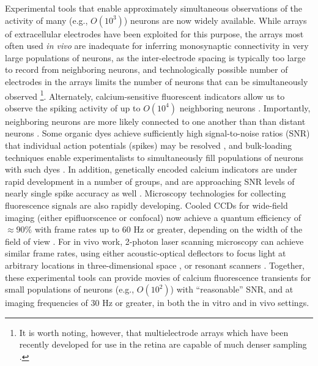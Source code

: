 Experimental tools that enable approximately simultaneous observations of the activity of many (e.g., $O(10^3)$) neurons are now widely available. While arrays of extracellular electrodes have been exploited for this purpose, the arrays most often used \emph{in vivo} are inadequate for inferring monosynaptic connectivity in very large populations of neurons, as the inter-electrode spacing is typically too large to record from neighboring neurons, and technologically possible number of electrodes in the arrays limits the number of neurons that can be simultaneously observed \cite{HATS98,HARR03,Stein04,Santhanam06,Harris07}\footnote{It is worth noting, however, that multielectrode arrays which have been recently developed for use in the retina are capable of much denser sampling \cite{Berry2004,Litke2004,Petrusca07,PILL07}.}. Alternately, calcium-sensitive fluorescent indicators allow us to observe the spiking activity of up to $O(10^4)$ neighboring neurons \cite{Tsien89}.  Importantly, neighboring neurons are more likely connected to one another than than distant neurons \cite{Abeles91,Braitenberg1998}. Some organic dyes achieve sufficiently high signal-to-noise ratios (SNR) that individual action potentials (spikes) may be resolved \cite{ImagingManual}, and bulk-loading techniques enable experimentalists to simultaneously fill populations of neurons with such dyes \cite{StosiekKonnerth03}. In addition, genetically encoded calcium indicators are under rapid development in a number of groups, and are approaching SNR levels of nearly single spike accuracy as well \cite{WallaceHasan08}. Microscopy technologies for collecting fluorescence signals are also rapidly developing. Cooled CCDs for wide-field imaging (either epifluorscence or confocal) now achieve a quantum efficiency of $\approx 90 \%$ with frame rates up to $60$ Hz or greater, depending on the width of the field of view \cite{Djurisic04}. For in vivo work, 2-photon laser scanning microscopy can achieve similar frame rates, using either acoustic-optical deflectors to focus light at arbitrary locations in three-dimensional space \cite{ReddySaggau05,Iyer06,SalomeBourdieu06,ReddySaggau08}, or resonant scanners \cite{NguyenParker01}. Together, these experimental tools can provide movies of calcium fluorescence transients for small populations of neurons (e.g., $O(10^2)$) with ``reasonable'' SNR, and at imaging frequencies of $30$ Hz or greater, in both the in vitro and in vivo settings.

